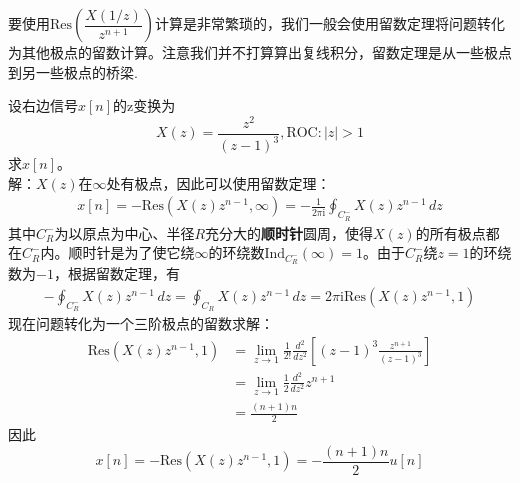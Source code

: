 要使用$\text{Res}\left(\dfrac{X(1/z)}{z^{n+1}}\right)$计算是非常繁琐的，我们一般会使用留数定理将问题转化为其他极点的留数计算。注意我们并不打算算出复线积分，留数定理是从一些极点到另一些极点的桥梁.
\begin{example}
    设右边信号$x[n]$的z变换为
    \[X(z)=\frac{z^2}{(z-1)^3},\text{ROC}:|z|>1\]
    求$x[n]$。\\
    解：$X(z)$在$\infty$处有极点，因此可以使用留数定理：
    \begin{align*}
        x[n]=-\text{Res}\left(X(z)z^{n-1},\infty\right)=-\frac{1}{2\pi \mathrm{i}}\oint_{C^-_R}X(z)z^{n-1}\,dz
    \end{align*}
    其中$C^-_R$为以原点为中心、半径$R$充分大的\textbf{顺时针}圆周，使得$X(z)$的所有极点都在$C^-_R$内。顺时针是为了使它绕$\infty$的环绕数$\text{Ind}_{C^-_R}(\infty)=1$。由于$C^-_R$绕$z=1$的环绕数为$-1$，根据留数定理，有
    \begin{align*}
        -\oint_{C^-_R}X(z)z^{n-1}\,dz=\oint_{C_R}X(z)z^{n-1}\,dz=2\pi \mathrm{i} \text{Res}\left(X(z)z^{n-1},1\right)
    \end{align*}
    现在问题转化为一个三阶极点的留数求解：
    \begin{align*}
        \text{Res}\left(X(z)z^{n-1},1\right)&=\lim_{z\to 1}\frac{1}{2!}\frac{d^2}{dz^2}\left[(z-1)^3\frac{z^{n+1}}{(z-1)^3}\right]\\
        &=\lim_{z\to 1}\frac{1}{2}\frac{d^2}{dz^2}z^{n+1}\\
        &=\frac{(n+1)n}{2}
    \end{align*}
    因此$$x[n]=-\text{Res}\left(X(z)z^{n-1},1\right)=-\frac{(n+1)n}{2}u[n]$$    
\end{example}

